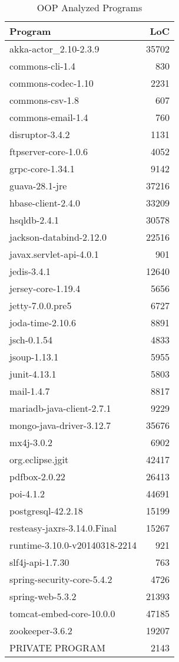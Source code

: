 \documentclass[12pt, a4paper]{article}
\begin{document}
\begin{longtable}[H]{l r}
    \caption{OOP Analyzed Programs}\label{table:ax_oop_prog_1}\\
        Program & LoC \\
        \hline            
        \endhead
        akka-actor\_2.10-2.3.9 & 35702 \\
        commons-cli-1.4 & 830 \\
        commons-codec-1.10 & 2231 \\
        commons-csv-1.8 & 607 \\
        commons-email-1.4 & 760 \\
        disruptor-3.4.2 & 1131 \\
        ftpserver-core-1.0.6 & 4052 \\
        grpc-core-1.34.1 & 9142 \\
        guava-28.1-jre & 37216 \\
        hbase-client-2.4.0 & 33209 \\
        hsqldb-2.4.1 & 30578 \\
        jackson-databind-2.12.0 & 22516 \\
        javax.servlet-api-4.0.1 & 901 \\
        jedis-3.4.1 & 12640 \\
        jersey-core-1.19.4 & 5656 \\
        jetty-7.0.0.pre5 & 6727 \\
        joda-time-2.10.6 & 8891 \\
        jsch-0.1.54 & 4833 \\
        jsoup-1.13.1 & 5955 \\
        junit-4.13.1 & 5803 \\
        mail-1.4.7 & 8817 \\
        mariadb-java-client-2.7.1 & 9229 \\
        mongo-java-driver-3.12.7 & 35676 \\
        mx4j-3.0.2 & 6902 \\
        org.eclipse.jgit & 42417 \\
        pdfbox-2.0.22 & 26413 \\
        poi-4.1.2 & 44691 \\
        postgresql-42.2.18 & 15199 \\
        resteasy-jaxrs-3.14.0.Final & 15267 \\
        runtime-3.10.0-v20140318-2214 & 921 \\
        slf4j-api-1.7.30 & 763 \\
        spring-security-core-5.4.2 & 4726 \\
        spring-web-5.3.2 & 21393 \\
        tomcat-embed-core-10.0.0 & 47185 \\
        zookeeper-3.6.2 & 19207 \\
        PRIVATE PROGRAM & 2143
\end{longtable}
\end{document}
